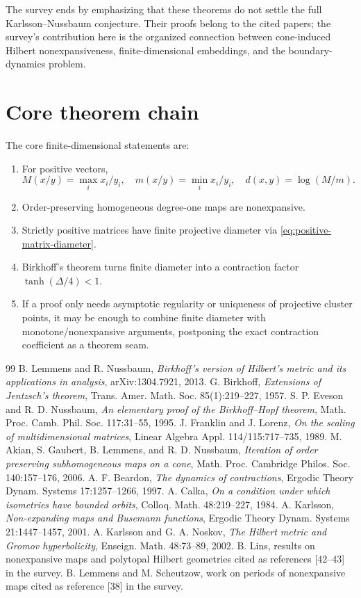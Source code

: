\documentclass[11pt]{article}
\begin{document}
The survey ends by emphasizing that these theorems do not settle the full Karlsson--Nussbaum
conjecture.  Their proofs belong to the cited papers; the survey's contribution here is the organized
connection between cone-induced Hilbert nonexpansiveness, finite-dimensional embeddings, and the
boundary-dynamics problem.

\section{Core theorem chain}
The core finite-dimensional statements are:
\begin{enumerate}[leftmargin=2em]
\item For positive vectors,
\[
  M(x/y)=\max_i x_i/y_i,
  \quad
  m(x/y)=\min_i x_i/y_i,
  \quad
  d(x,y)=\log(M/m).
\]
\item Order-preserving homogeneous degree-one maps are nonexpansive.
\item Strictly positive matrices have finite projective diameter via \eqref{eq:positive-matrix-diameter}.
\item Birkhoff's theorem turns finite diameter into a contraction factor \(\tanh(\Delta/4)<1\).
\item If a proof only needs asymptotic regularity or uniqueness of projective cluster points, it may be enough to combine finite diameter with monotone/nonexpansive arguments, postponing the exact contraction coefficient as a theorem seam.
\end{enumerate}

\begin{thebibliography}{99}
 B. Lemmens and R. Nussbaum, \emph{Birkhoff's version of Hilbert's metric and its applications in analysis}, arXiv:1304.7921, 2013.
 G. Birkhoff, \emph{Extensions of Jentzsch's theorem}, Trans. Amer. Math. Soc. 85(1):219--227, 1957.
 S. P. Eveson and R. D. Nussbaum, \emph{An elementary proof of the Birkhoff--Hopf theorem}, Math. Proc. Camb. Phil. Soc. 117:31--55, 1995.
 J. Franklin and J. Lorenz, \emph{On the scaling of multidimensional matrices}, Linear Algebra Appl. 114/115:717--735, 1989.
 M. Akian, S. Gaubert, B. Lemmens, and R. D. Nussbaum, \emph{Iteration of order preserving subhomogeneous maps on a cone}, Math. Proc. Cambridge Philos. Soc. 140:157--176, 2006.
 A. F. Beardon, \emph{The dynamics of contractions}, Ergodic Theory Dynam. Systems 17:1257--1266, 1997.
 A. Calka, \emph{On a condition under which isometries have bounded orbits}, Colloq. Math. 48:219--227, 1984.
 A. Karlsson, \emph{Non-expanding maps and Busemann functions}, Ergodic Theory Dynam. Systems 21:1447--1457, 2001.
 A. Karlsson and G. A. Noskov, \emph{The Hilbert metric and Gromov hyperbolicity}, Enseign. Math. 48:73--89, 2002.
 B. Lins, results on nonexpansive maps and polytopal Hilbert geometries cited as references [42--43] in the survey.
 B. Lemmens and M. Scheutzow, work on periods of nonexpansive maps cited as reference [38] in the survey.
\end{thebibliography}
\end{document}
